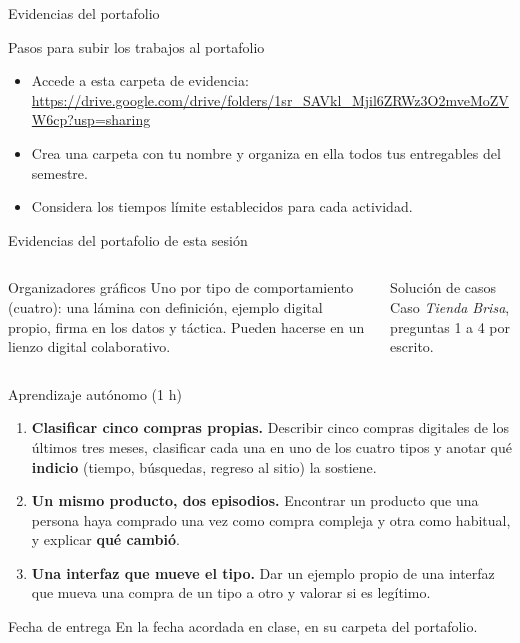\documentclass[aspectratio=169,xcolor=dvipsnames]{beamer}
\begin{document}
\begin{frame}{Evidencias del portafolio}
\begin{block}{Pasos para subir los trabajos al portafolio}
    \begin{itemize}
    \item Accede a esta carpeta de evidencia: \url{https://drive.google.com/drive/folders/1sr_SAVkl_Mjil6ZRWz3O2mveMoZVW6cp?usp=sharing}
    \item Crea una carpeta con tu nombre y organiza en ella todos tus entregables del semestre.
    \item Considera los tiempos límite establecidos para cada actividad.
    \end{itemize}
  \end{block}
\end{frame}

\begin{frame}{Evidencias del portafolio de esta sesión}
\small
\begin{columns}[T]
  \begin{block}{Organizadores gráficos}
    \scriptsize Uno por tipo de comportamiento (cuatro): una lámina con definición, ejemplo digital propio, firma en los datos y táctica. Pueden hacerse en un lienzo digital colaborativo.
  \end{block}
  \begin{block}{Solución de casos}
    \scriptsize Caso \textit{Tienda Brisa}, preguntas 1 a 4 por escrito.
  \end{block}
\end{columns}
\end{frame}

\begin{frame}{Aprendizaje autónomo (1 h)}
\footnotesize
\begin{enumerate}
  \item \textbf{Clasificar cinco compras propias.} Describir cinco compras digitales de los últimos tres meses, clasificar cada una en uno de los cuatro tipos y anotar qué \textbf{indicio} (tiempo, búsquedas, regreso al sitio) la sostiene.
  \vspace{2pt}
  \item \textbf{Un mismo producto, dos episodios.} Encontrar un producto que una persona haya comprado una vez como compra compleja y otra como habitual, y explicar \textbf{qué cambió}.
  \vspace{2pt}
  \item \textbf{Una interfaz que mueve el tipo.} Dar un ejemplo propio de una interfaz que mueva una compra de un tipo a otro y valorar si es legítimo.
\end{enumerate}
\vspace{2pt}
\begin{alertblock}{Fecha de entrega}
  En la fecha acordada en clase, en su carpeta del portafolio.
\end{alertblock}
\end{frame}
\end{document}
